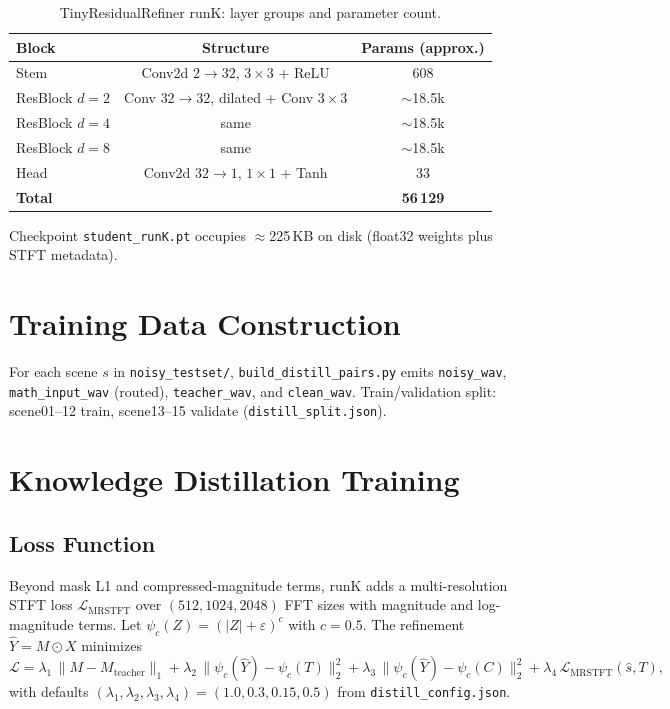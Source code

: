 \begin{table}[H]
  \centering
  \caption{TinyResidualRefiner runK: layer groups and parameter count.}
  \label{tab:student_params}
  \begin{tabular}{lcc}
    \toprule
    \textbf{Block} & \textbf{Structure} & \textbf{Params (approx.)} \\
    \midrule
    Stem            & Conv2d $2\to32$, $3\times3$ + ReLU        & 608 \\
    ResBlock $d=2$  & Conv $32\to32$, dilated + Conv $3\times3$ & $\sim$18.5k \\
    ResBlock $d=4$  & same                                      & $\sim$18.5k \\
    ResBlock $d=8$  & same                                      & $\sim$18.5k \\
    Head            & Conv2d $32\to1$, $1\times1$ + Tanh          & 33 \\
    \midrule
    \textbf{Total}  &                                           & \textbf{56\,129} \\
    \bottomrule
  \end{tabular}
\end{table}

Checkpoint \texttt{student\_runK.pt} occupies $\approx$225\,KB on disk (float32 weights plus STFT metadata).

\section{Training Data Construction}
\label{sec:distill_pairs}

For each scene $s$ in \texttt{noisy\_testset/}, \texttt{build\_distill\_pairs.py} emits \texttt{noisy\_wav}, \texttt{math\_input\_wav} (routed), \texttt{teacher\_wav}, and \texttt{clean\_wav}. Train/validation split: scene01--12 train, scene13--15 validate (\texttt{distill\_split.json}).

\section{Knowledge Distillation Training}
\label{sec:distill_training}

\subsection{Loss Function}

Beyond mask L1 and compressed-magnitude terms, runK adds a multi-resolution STFT loss $\mathcal{L}_{\mathrm{MRSTFT}}$ over $(512,1024,2048)$ FFT sizes with magnitude and log-magnitude terms. Let $\psi_c(Z)=(|Z|+\varepsilon)^c$ with $c=0.5$. The refinement $\hat{Y}=M\odot X$ minimizes
\begin{equation}
  \mathcal{L} =
    \lambda_1 \,\| M - M_{\mathrm{teacher}} \|_1
  + \lambda_2 \,\| \psi_c(\hat{Y}) - \psi_c(T) \|_2^2
  + \lambda_3 \,\| \psi_c(\hat{Y}) - \psi_c(C) \|_2^2
  + \lambda_4 \,\mathcal{L}_{\mathrm{MRSTFT}}(\hat{s}, T),
  \label{eq:distill_loss_runk}
\end{equation}
with defaults $(\lambda_1,\lambda_2,\lambda_3,\lambda_4)=(1.0, 0.3, 0.15, 0.5)$ from \texttt{distill\_config.json}.

